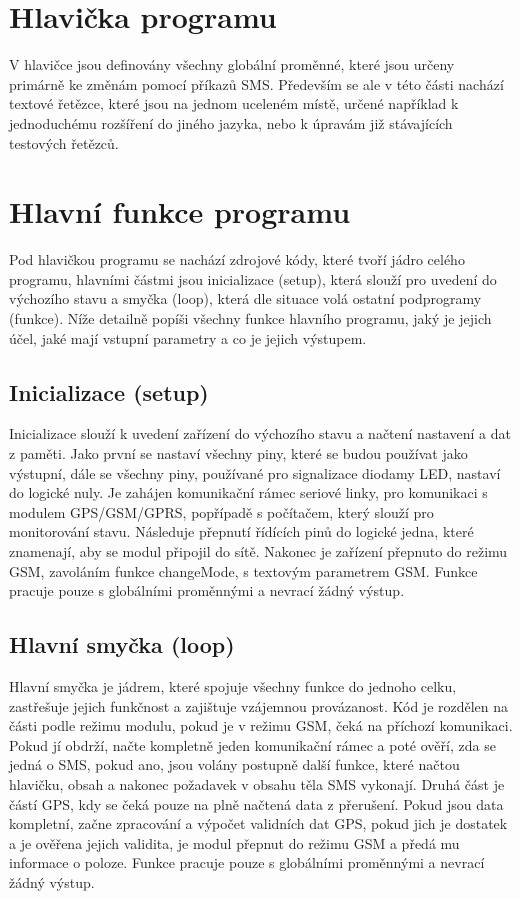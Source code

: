 \documentclass[FM,MP]{tulthesis}  %
\begin{document}

\section{Hlavička programu}
V hlavičce jsou definovány všechny globální proměnné, které jsou určeny primárně ke změnám pomocí příkazů SMS. Především se ale v této části nachází textové řetězce, které jsou na jednom uceleném místě, určené například k jednoduchému rozšíření do jiného jazyka, nebo k úpravám již stávajících testových řetězců.

\section{Hlavní funkce programu}
Pod hlavičkou programu se nachází zdrojové kódy, které tvoří jádro celého programu, hlavními částmi jsou inicializace (setup), která slouží pro uvedení do výchozího stavu a smyčka (loop), která dle situace volá ostatní podprogramy (funkce). Níže detailně popíši všechny funkce hlavního programu, jaký je jejich účel, jaké mají vstupní parametry a co je jejich výstupem.

\subsection{Inicializace (setup)}
Inicializace slouží k uvedení zařízení do výchozího stavu a načtení nastavení a dat z paměti. Jako první se nastaví všechny piny, které se budou používat jako výstupní, dále se všechny piny, používané pro signalizace diodamy LED, nastaví do logické nuly. Je zahájen komunikační rámec seriové linky, pro komunikaci s modulem GPS/GSM/GPRS, popřípadě s počítačem, který slouží pro monitorování stavu.  Následuje přepnutí řídících pinů do logické jedna, které znamenají, aby se modul připojil do sítě. Nakonec je zařízení přepnuto do režimu GSM, zavoláním funkce changeMode, s textovým parametrem GSM. Funkce pracuje pouze s globálními proměnnými a nevrací žádný výstup.

\subsection{Hlavní smyčka (loop)}
Hlavní smyčka je jádrem, které spojuje všechny funkce do jednoho celku, zastřešuje jejich funkčnost a zajištuje vzájemnou provázanost. Kód je rozdělen na části podle režimu modulu, pokud je v režimu GSM, čeká na příchozí komunikaci. Pokud jí obdrží, načte kompletně jeden komunikační rámec a poté ověří, zda se jedná o SMS, pokud ano, jsou volány postupně další funkce, které načtou hlavičku, obsah a nakonec požadavek v obsahu těla SMS vykonají. Druhá část je částí GPS, kdy se čeká pouze na plně načtená data z přerušení. Pokud jsou data kompletní, začne zpracování a výpočet validních dat GPS, pokud jich je dostatek a je ověřena jejich validita, je modul přepnut do režimu GSM a předá mu informace o poloze. Funkce pracuje pouze s globálními proměnnými a nevrací žádný výstup.
\end{document}
